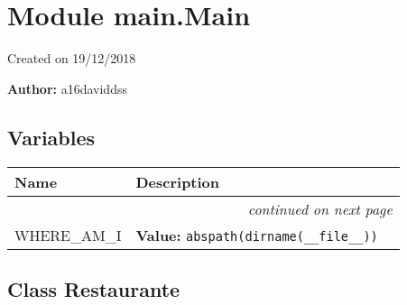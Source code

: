 %
%
%


\section{Module main.Main}

    \label{main:Main}
Created on 19/12/2018

\textbf{Author:} a16daviddss





  \subsection{Variables}

    \vspace{-1cm}
\hspace{\varindent}\begin{longtable}{|p{\varnamewidth}|p{\vardescrwidth}|l}
\cline{1-2}
\cline{1-2} \centering \textbf{Name} & \centering \textbf{Description}& \\
\cline{1-2}
\endhead\cline{1-2}\multicolumn{3}{r}{\small\textit{continued on next page}}\\\endfoot\cline{1-2}
\endlastfoot\raggedright W\-H\-E\-R\-E\-\_\-A\-M\-\_\-I\- & \raggedright \textbf{Value:} 
{\tt abspath(dirname(\_\_file\_\_))}&\\
\cline{1-2}
\end{longtable}



\subsection{Class Restaurante}

